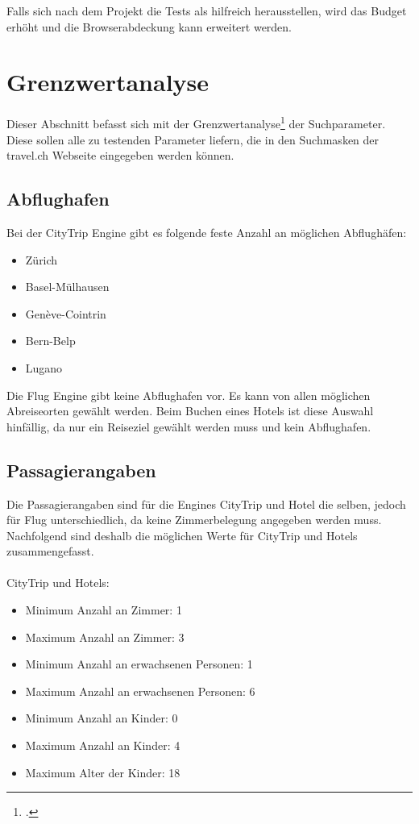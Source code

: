 Falls sich nach dem Projekt die Tests als hilfreich herausstellen, wird das Budget erhöht und die Browserabdeckung kann erweitert werden.

\section{Grenzwertanalyse}
\label{sec:analyse:grenzwertanalyse}
Dieser Abschnitt befasst sich mit der Grenzwertanalyse\footcite{Dynamisches_Software-Testverfahren__Wikipedia_2015-10-25} der Suchparameter. Diese sollen alle zu testenden Parameter liefern, die in den Suchmasken der travel.ch Webseite eingegeben werden können.

\subsection{Abflughafen}
Bei der CityTrip Engine gibt es folgende feste Anzahl an möglichen Abflughäfen:
\begin{itemize}
\item Zürich
\item Basel-Mülhausen
\item Genève-Cointrin
\item Bern-Belp
\item Lugano
\end{itemize}

Die Flug Engine gibt keine Abflughafen vor. Es kann von allen möglichen Abreiseorten gewählt werden.
Beim Buchen eines Hotels ist diese Auswahl hinfällig, da nur ein Reiseziel gewählt werden muss und kein Abflughafen.

\subsection{Passagierangaben}
Die Passagierangaben sind für die Engines CityTrip und Hotel die selben, jedoch für Flug unterschiedlich, da keine Zimmerbelegung angegeben werden muss. Nachfolgend sind deshalb die möglichen Werte für CityTrip und Hotels zusammengefasst.\\
\\  
\noindent CityTrip und Hotels:
\begin{itemize}
\item Minimum Anzahl an Zimmer: 1
\item Maximum Anzahl an Zimmer: 3
\item Minimum Anzahl an erwachsenen Personen: 1
\item Maximum Anzahl an erwachsenen Personen: 6
\item Minimum Anzahl an Kinder: 0
\item Maximum Anzahl an Kinder: 4
\item Maximum Alter der Kinder: 18
\end{itemize}

